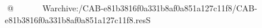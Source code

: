    @    	 
                                                    	 W   archive:/CAB-e81b3816f0a331b8af0a851a127c11f8/CAB-e81b3816f0a331b8af0a851a127c11f8.resS 